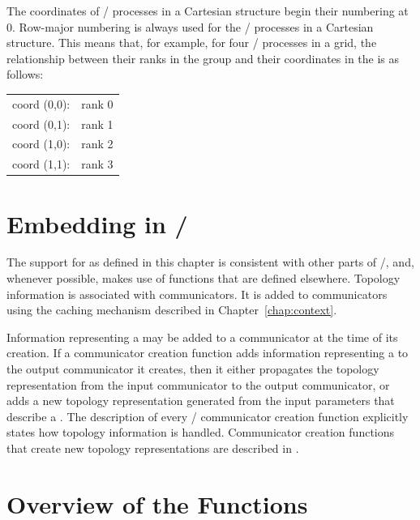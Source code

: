 The coordinates of \MPI/ processes in a Cartesian structure begin their numbering at $0$.
Row-major numbering is always used for the \MPI/ processes in a
Cartesian structure. This means that, for example, for four \MPI/ processes in a
 grid, the relationship between their ranks in the group
and their coordinates in the  is as follows:
\begin{center}
\begin{tabular}{ll}
 coord (0,0): & rank 0 \\
 coord (0,1): & rank 1 \\
 coord (1,0): & rank 2 \\
 coord (1,1): & rank 3 \\
\end{tabular}
\end{center}

\section{Embedding in \texorpdfstring{\MPI/}{MPI}}
The support for  as defined in this chapter is
consistent with other parts of \MPI/, and, whenever possible,
makes use of functions that are defined elsewhere.
Topology information is associated with communicators. It is added
to communicators using the caching mechanism described in
Chapter~\ref{chap:context}.

Information representing a  may be added to a communicator at the time of its creation.
If a communicator creation function adds information representing a  to the output communicator it creates, then it either propagates the topology representation from the input communicator to the output communicator, or adds a new topology representation generated from the input parameters that describe a .
The description of every \MPI/ communicator creation function explicitly states how topology information is handled.
Communicator creation functions that create new topology representations are described in .


\section{Overview of the Functions}
\label{subsec:topol-overview}

